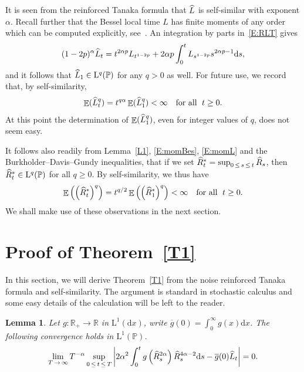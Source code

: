 \documentclass[10pt]{amsart}
\newtheorem{lemm}[theo]{Lemma}\newtheorem{prop}[theo]{Proposition}\newtheorem{coro}[theo]{Corollary}\newtheorem{conj}[theo]{Conjecture}
\theoremstyle{definition}\newtheorem{defi}[theo]{Definition}\newtheorem{rema}[theo]{Remark}\newtheorem{exam}[theo]{Example}\newtheorem{exem}[theo]{Example}\newtheorem{nota}[theo]{Notation}
\renewcommand{\bar}[1]{\overline{#1}}
\renewcommand{\hat}[1]{\widehat{#1}}
\newcommand{\dd}{\mathrm{d}}
\newcommand{\rmL}{\mathrm{L}}
\DeclareMathOperator{\E}{\mathbb{E}}
\renewcommand{\P}{\mathbb{P}}
\newcommand{\R}{\mathbb{R}}
\let\oldhat\hat
\renewcommand*{\hat}[1]{\mathchoice{\widehat{#1}}{\widehat{#1}}{\oldhat{#1}}{\oldhat{#1}}}
\begin{document}
It is seen from the reinforced Tanaka formula that $\hat{L}$ is self-similar with exponent $\alpha$. Recall further that the Bessel local time ${L}$ has finite moments of any order which can be computed explicitly, see~\cite[Proposition~3.4]{DRVY}. An integration by parts in~\eqref{E:RLT} gives
\[
(1-2p)^{\alpha} \hat{L}_t= t^{2\alpha p} {L}_{t^{1-2p}} + 2\alpha p \int _0^{t} {L}_{s^{1-2p}} s^{2\alpha p-1} \dd s,
\]
and it follows that $\hat{L}_1\in {\rmL}^q(\P)$ for any $q>0$ as well. For future use, we record that, by self-similarity,
\begin{equation}\label{E:momL}
\E(\hat{L}_t^q) = t^{q \alpha} \E(\hat{L}_1^q)< \infty\quad \text{for all }\;t\geq 0.
\end{equation}
At this point the determination of $\E(\hat{L}_1^q)$, even for integer values of $q$, does not seem easy.


It follows also readily from Lemma~\ref{L1}, \eqref{E:momBes}, \eqref{E:momL} and the Burkholder--Davis--Gundy inequalities, that if we set $\hat R^*_t=\sup_{0\,\leq\,s\,\leq\,t} \hat R_s$, then $\hat R^*_t\in {\rmL}^q(\P)$ for all $q\geq 0$. By self-similarity, we thus have
\begin{equation}\label{E:momR}
\E\left(\left(\hat R^*_t\right)^q\right) = t^{q/2} \E\left(\left(\hat R^*_1\right)^q\right) < \infty \quad \text{for all }\;t\geq 0.
\end{equation}
We shall make use of these observations in the next section.

\section{Proof of Theorem~\ref{T1}}\label{sec:ProofThm1}
In this section, we will derive Theorem~\ref{T1} from the noise reinforced Tanaka formula and self-similarity. The argument is standard in stochastic calculus and some easy details of the calculation will be left to the reader.

\begin{lemm}\label{L2}
Let $g: \R_+\to \R$ in $\rmL^1(\dd x)$, write $\bar g(0)=\int_0^{\infty}g(x)\dd x$. The following convergence holds in $\rmL^1(\P)$.
\[
\lim_{T\,\to\,\infty} T^{-\alpha} \sup_{0\,\leq\,t\,\leq\,T} \left| 2\alpha^2 \int_0^{t} g\left(\hat R^{2\alpha}_s\right)\hat R_s^{4\alpha-2} \dd s - \bar g(0) \hat{L}_t \right| = 0.
\]
\end{lemm}
\end{document}
